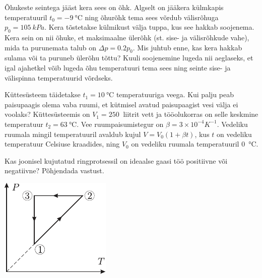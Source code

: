 \documentclass[10pt]{article}
\begin{document}
{
Õhukeste seintega jääst kera sees on õhk. Algselt on jääkera külmkapis temperatuuril $t_0 = \SI{-9}{\degreeCelsius}$ ning õhurõhk tema sees võrdub välisrõhuga $p_0 = \SI{105}{kPa}$. Kera tõstetakse külmikust välja tuppa, kus see hakkab soojenema. Kera sein on nii õhuke, et maksimaalne ülerõhk (st. sise- ja välisrõhkude vahe), mida ta purunemata talub on $\Delta p = \num{0,2}p_0$. Mis juhtub enne, kas kera hakkab sulama või ta puruneb ülerõhu tõttu? Kuuli soojenemine lugeda nii aeglaseks, et igal ajahetkel võib lugeda õhu temperatuuri tema sees ning seinte sise- ja välispinna temperatuurid võrdseks.
\probend
\bigskip


Küttesüsteem täidetakse $t_1=\SI{10}{\degreeCelsius}$ temperatuuriga veega. Kui palju peab paisupaagis olema vaba ruumi, et kütmisel avatud paisupaagist vesi välja ei voolaks? Küttesüsteemis on $V_1=\SI{250}{}$ liitrit vett ja tööolukorras on selle keskmine temperatuur $t_2=\SI{63}{\degreeCelsius}$. Vee ruumpaisumistegur on $\beta=3\times 10^{-4}K^{-1}$. Vedeliku ruumala mingil temperatuuril avaldub kujul $V=V_{0}(1+\beta t)$, kus $t$ on vedeliku temperatuur Celsiuse kraadides, ning $V_{0}$ on vedeliku ruumala temperatuuril \SI{0}{\degreeCelsius}.
\probend
\bigskip


Kas joonisel kujutatud ringprotsessil on ideaalse gaasi töö positiivne või negatiivne? Põhjendada vastust.

\begin{center}
	\includegraphics[width=0.4\linewidth]{2006-v2g-02-yl}
\end{center}
\probend
\bigskip


}
\end{document}

